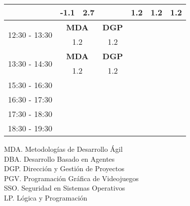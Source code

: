 \documentclass[10pt,spanish, landscape]{article}
\begin{document}
\begin{minipage}{0.7\textwidth}
\begin{tabular}{|c|cc|cc|cc|cc|cc|}
 & {\footnotesize -1.1} & {\footnotesize 2.7} & {\footnotesize  } & {\footnotesize  }& \multicolumn{2}{|c|}{ \cellcolor{grisclaro} {\footnotesize 1.2}}& \multicolumn{2}{|c|}{ \cellcolor{grisclaro} {\footnotesize 1.2}}& \multicolumn{2}{|c|}{ \cellcolor{grisclaro} {\footnotesize 1.2}}\\ 
 \hline
\multirow{2}{*}{12:30 - 13:30} & \multicolumn{2}{|c|}{ \cellcolor{grisclaro} \textbf{MDA}}& \multicolumn{2}{|c|}{ \cellcolor{grisclaro} \textbf{DGP}} &  &  &  &  &  & \\ 
& \multicolumn{2}{|c|}{ \cellcolor{grisclaro} {\footnotesize 1.2}}& \multicolumn{2}{|c|}{ \cellcolor{grisclaro} {\footnotesize 1.2}} &  &  &  &  &  & \\ 
 \hline
\multirow{2}{*}{13:30 - 14:30} & \multicolumn{2}{|c|}{ \cellcolor{grisclaro} \textbf{MDA}}& \multicolumn{2}{|c|}{ \cellcolor{grisclaro} \textbf{DGP}} &  &  &  &  &  & \\ 
& \multicolumn{2}{|c|}{ \cellcolor{grisclaro} {\footnotesize 1.2}}& \multicolumn{2}{|c|}{ \cellcolor{grisclaro} {\footnotesize 1.2}} &  &  &  &  &  & \\ 
 \hline
\multirow{2}{*}{15:30 - 16:30}  &  &  &  &  &  &  &  &  &  & \\ 
 &  &  &  &  &  &  &  &  &  & \\ 
 \hline
\multirow{2}{*}{16:30 - 17:30}  &  &  &  &  &  &  &  &  &  & \\ 
 &  &  &  &  &  &  &  &  &  & \\ 
 \hline
\multirow{2}{*}{17:30 - 18:30}  &  &  &  &  &  &  &  &  &  & \\ 
 &  &  &  &  &  &  &  &  &  & \\ 
 \hline
\multirow{2}{*}{18:30 - 19:30}  &  &  &  &  &  &  &  &  &  & \\ 
 &  &  &  &  &  &  &  &  &  & \\ 
 \hline

\end{tabular}
\end{minipage}
\begin{minipage}{0.25\textwidth}
MDA. Metodologías de Desarrollo Ágil\\[0.5cm]
DBA. Desarrollo Basado en Agentes\\[0.5cm]
DGP. Dirección y Gestión de Proyectos\\[0.5cm]
PGV. Programación Gráfica de Videojuegos\\[0.5cm]
SSO. Seguridad en Sistemas Operativos\\[0.5cm]
LP. Lógica y Programación\\[0.5cm]
\end{minipage}
\newpage
\end{document}
